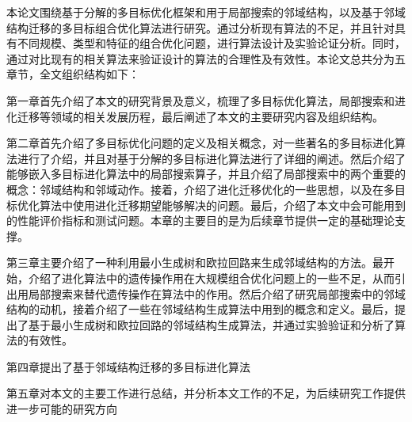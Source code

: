 本论文围绕基于分解的多目标优化框架和用于局部搜索的邻域结构，以及基于邻域结构迁移的多目标组合优化算法进行研究。通过分析现有算法的不足，并且针对具有不同规模、类型和特征的组合优化问题，进行算法设计及实验论证分析。同时，通过对比现有的相关算法来验证设计的算法的合理性及有效性。本论文总共分为五章节，全文组织结构如下：
\par
第一章首先介绍了本文的研究背景及意义，梳理了多目标优化算法，局部搜索和进化迁移等领域的相关发展历程，最后阐述了本文的主要研究内容及组织结构。
\par
第二章首先介绍了多目标优化问题的定义及相关概念，对一些著名的多目标进化算法进行了介绍，并且对基于分解的多目标进化算法进行了详细的阐述。然后介绍了能够嵌入多目标进化算法中的局部搜索算子，并且介绍了局部搜索中的两个重要的概念：邻域结构和邻域动作。接着，介绍了进化迁移优化的一些思想，以及在多目标优化算法中使用进化迁移期望能够解决的问题。最后，介绍了本文中会可能用到的性能评价指标和测试问题。本章的主要目的是为后续章节提供一定的基础理论支撑。
\par
第三章主要介绍了一种利用最小生成树和欧拉回路来生成邻域结构的方法。最开始，介绍了进化算法中的遗传操作用在大规模组合优化问题上的一些不足，从而引出用局部搜索来替代遗传操作在算法中的作用。然后介绍了研究局部搜索中的邻域结构的动机，接着介绍了一些在邻域结构生成算法中用到的概念和定义。最后，提出了基于最小生成树和欧拉回路的邻域结构生成算法，并通过实验验证和分析了算法的有效性。
\par
第四章提出了基于邻域结构迁移的多目标进化算法
\par
第五章对本文的主要工作进行总结，并分析本文工作的不足，为后续研究工作提供进一步可能的研究方向